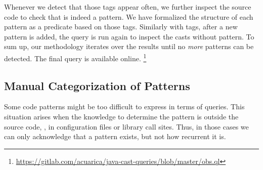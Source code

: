 Whenever we detect that those tags appear often,
we further inspect the source code to check that is indeed a pattern.
We have formalized the structure of each pattern as a \ql{} predicate based on those tags.
Similarly with tags, after a new pattern is added,
the query is run again to inspect the casts without pattern.
To sum up, our methodology iterates over the results until
no \emph{more} patterns can be detected.
The final \ql{} query is available online.%
\footnote{\url{https://gitlab.com/acuarica/java-cast-queries/blob/master/obs.ql}}


\subsection*{Manual Categorization of Patterns}

Some code patterns might be too difficult to
express in terms of \ql{} queries.
This situation arises when the knowledge to determine
the pattern is outside the source code,
\eg, in configuration files or library call sites.
Thus, in those cases we can only acknowledge that a pattern exists,
but not how recurrent it is.

% 



\newcommand{\patternsection}[1]{\subsubsection*{\textbf{#1}}}

\newenvironment{pattern}[1]{
	\newcommand{\desc}{\patternsection{Description}}
	\newcommand{\instances}{\patternsection{Instances}}
	\newcommand{\detection}{\patternsection{Detection}}
	\newcommand{\discussion}{\patternsection{Discussion}}
	\subsection{\cpattern{#1}}

	\desc
}{}

